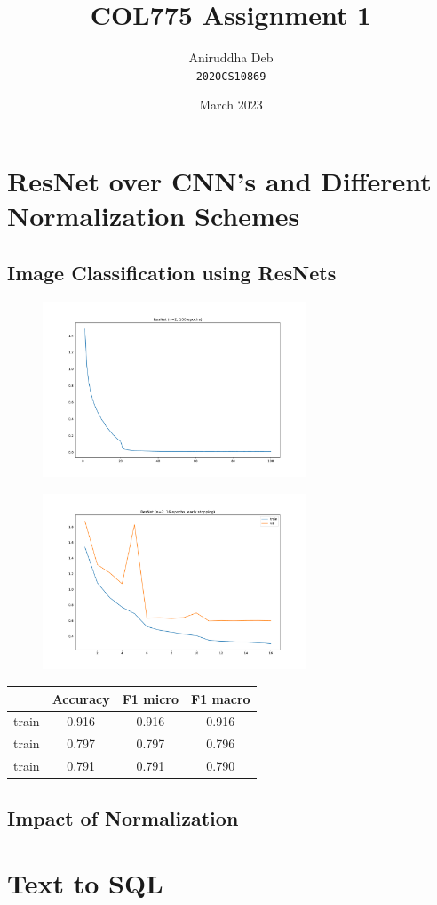 \documentclass[12pt]{article}
\title{\textbf{COL775 Assignment 1}}
\author{Aniruddha Deb \\ \texttt{2020CS10869}}
\date{March 2023}
\begin{document}
\maketitle

\section{ResNet over CNN's and Different Normalization Schemes}

\subsection{Image Classification using ResNets}

\begin{figure}[!htbp]
\centering
\includegraphics[width=0.7\textwidth]{../ResNet/q1_part2.pdf}
\end{figure}

\begin{figure}[!htbp]
\centering
\includegraphics[width=0.7\textwidth]{../ResNet/q1_part3.pdf}
\end{figure}

\begin{center}
\begin{tabular}{|l|c|c|c|}
    \hline
    & Accuracy & F1 micro & F1 macro \\ 
    \hline
    train & 0.916 & 0.916 & 0.916 \\
    train & 0.797 & 0.797 & 0.796 \\
    train & 0.791 & 0.791 & 0.790 \\
    \hline
\end{tabular}
\end{center}

\subsection{Impact of Normalization}

\section{Text to SQL}
\end{document}

